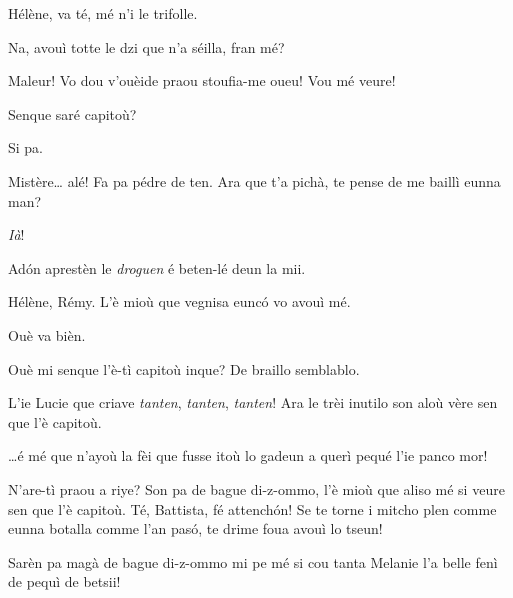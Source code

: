 \begin{drama}
\Remyspeaks Hélène, va té, mé n'i le trifolle.

\Helenespeaks Na, avouì totte le dzi que n'a séilla, fran mé?

\Cesarspeaks{} Maleur! Vo dou v'ouèide praou stoufia-me oueu! Vou mé veure!


\Hermannspeaks{} Senque saré capitoù?

\Peterspeaks Si pa.

\Hermannspeaks Mistère\ldots {} alé! Fa pa pédre de ten. Ara que t'a pichà, te pense de me baillì eunna man?

\Peterspeaks \textit{Ià}!

\Hermannspeaks Ad\'on aprestèn le \textit{droguen} é beten-lé deun la mii.



\Cesarspeaks{} Hélène, Rémy. L'è mioù que vegnisa eunc\'o vo avouì mé.

\Remyspeaks Ouè va bièn.




\Germainespeaks Ouè mi senque l’è-tì capitoù inque? De braillo semblablo. 

\Hermannspeaks L'ie Lucie que criave \textit{tanten}, \textit{tanten}, \textit{tanten}! Ara le trèi inutilo son aloù vère sen que l'è capitoù.

\Battistaspeaks  \ldots é mé que n’ayoù la fèi que fusse itoù lo gadeun a querì pequé l’ie panco mor!


\Germainespeaks N’are-tì praou a riye? Son pa de bague di-z-ommo, l'è mioù que aliso mé si veure sen que l’è capitoù. Té, Battista, fé attench\'on! Se te torne i mitcho plen comme eunna botalla comme l'an pas\'o, te drime foua avouì lo tseun! 


\Battistaspeaks  Sarèn pa magà de bague di-z-ommo mi pe mé si cou tanta Melanie l’a belle fenì de pequì de betsii! 


\end{drama}
